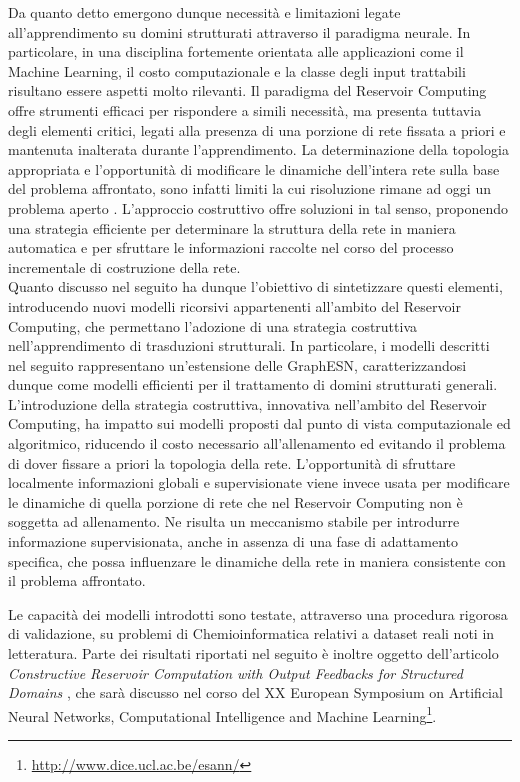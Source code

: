 Da quanto detto emergono dunque necessità e limitazioni legate all'apprendimento su domini strutturati attraverso il paradigma neurale.
In particolare, in una disciplina fortemente orientata alle applicazioni come il Machine Learning, il costo computazionale e la classe degli input trattabili risultano essere aspetti molto rilevanti. Il paradigma del Reservoir Computing offre strumenti efficaci per rispondere a simili necessità, ma presenta tuttavia degli elementi critici, legati alla presenza di una porzione di rete fissata a priori e mantenuta inalterata durante l'apprendimento. La determinazione della topologia appropriata e l'opportunità di modificare le dinamiche dell'intera rete sulla base del problema affrontato, sono infatti limiti la cui risoluzione rimane ad oggi un problema aperto \cite{Lukosevicius:ESNwithTrainedFeedbacks,Wyffels:stableOutputFeedback,Reinhart:ReservoirRegularization}.
L'approccio costruttivo offre soluzioni in tal senso, proponendo una strategia efficiente per determinare la struttura della rete in maniera automatica e per sfruttare le informazioni raccolte nel corso del processo incrementale di costruzione della rete.
\\
Quanto discusso nel seguito ha dunque l'obiettivo di sintetizzare questi elementi, introducendo nuovi modelli ricorsivi appartenenti all'ambito del Reservoir Computing, che permettano l'adozione di una strategia costruttiva nell'apprendimento di trasduzioni strutturali.
In particolare, i modelli descritti nel seguito rappresentano un'estensione delle GraphESN, caratterizzandosi dunque come modelli efficienti per il trattamento di domini strutturati generali. L'introduzione della strategia costruttiva, innovativa nell'ambito del Reservoir Computing, ha impatto sui modelli proposti dal punto di vista computazionale ed algoritmico, riducendo il costo necessario all'allenamento ed evitando il problema di dover fissare a priori la topologia della rete. L'opportunità di sfruttare localmente informazioni globali e supervisionate viene invece usata per modificare le dinamiche di quella porzione di rete che nel Reservoir Computing non è soggetta ad allenamento. Ne risulta un meccanismo stabile per introdurre informazione supervisionata, anche in assenza di una fase di adattamento specifica, che possa influenzare le dinamiche della rete in maniera consistente con il problema affrontato.

Le capacità dei modelli introdotti sono testate, attraverso una procedura rigorosa di validazione, su problemi di Chemioinformatica relativi a dataset reali noti in letteratura. Parte dei risultati riportati nel seguito è inoltre oggetto dell'articolo \textit{Constructive Reservoir Computation with Output Feedbacks for Structured Domains} \cite{Gallicchio:ConstructiveReservoir}, che sarà discusso nel corso del XX European Symposium on Artificial Neural Networks, Computational Intelligence and Machine Learning\footnote{\url{http://www.dice.ucl.ac.be/esann/}}.

